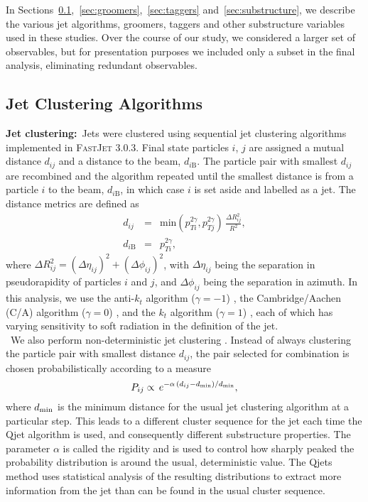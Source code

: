 In Sections~\ref{sec:jetalgs},~\ref{sec:groomers},~\ref{sec:taggers} and~\ref{sec:substructure}, we describe the various jet algorithms, groomers, taggers and other substructure variables used in these studies. Over the course of our study, we considered a larger set of observables, but for presentation purposes we included only a subset in the final analysis, eliminating redundant observables.

\subsection{Jet Clustering Algorithms}
\label{sec:jetalgs}

{\bf Jet clustering:}~Jets were clustered using sequential jet clustering algorithms \cite{Bethke:1988zc} implemented in \textsc{FastJet} 3.0.3. Final state particles $i$, $j$ are assigned a mutual distance $d_{ij}$ and a distance to the beam, $d_{i\mathrm{B}}$. The particle pair with smallest $d_{ij}$ are  recombined and the algorithm repeated until the smallest distance is from a particle $i$ to the beam, $d_{i\mathrm{B}}$, in which case $i$ is set aside and labelled as a jet. The distance metrics are defined as
%
\begin{eqnarray}
d_{ij} &=& \mathrm{min}(p_{Ti}^{2\gamma},p_{Tj}^{2\gamma})\,\frac{\Delta R_{ij}^2}{R^2},\\
d_{i\mathrm{B}} &=& p_{Ti}^{2\gamma},
\end{eqnarray}
%
where $\Delta R_{ij}^2=(\Delta \eta_{ij})^2+(\Delta\phi_{ij})^2$, with $\Delta \eta_{ij}$ being the separation in pseudorapidity of particles $i$ and $j$, and $\Delta \phi_{ij}$ being the separation in azimuth. In this analysis, we use the anti-$k_t$ algorithm ($\gamma=-1$) \cite{Cacciari:2008gp}, the Cambridge/Aachen (C/A) algorithm ($\gamma=0$) \cite{Dokshitzer:1997in,Wobisch:1998wt}, and the $k_t$ algorithm ($\gamma=1$) \cite{Catani:1993hr,Ellis:1993tq}, each of which has varying sensitivity to soft radiation in the definition of the jet.\\

~We also perform non-deterministic jet clustering \cite{Ellis:2012sn,Ellis:2014eya}. Instead of always clustering the particle pair with smallest distance $d_{ij}$, the pair selected for combination is chosen probabilistically according to a measure
%
\begin{equation}
P_{ij} \propto \,e^{-\alpha \,(d_{ij}-d_{\rm min})/d_{\rm min}},
\end{equation}
%
where $d_{\rm min}$ is the minimum distance for the usual jet clustering algorithm at a particular step. This leads to a different cluster sequence for the jet each time the Qjet algorithm is used, and consequently different substructure properties. The parameter $\alpha$ is called the rigidity and is used to control how sharply peaked the probability distribution is around the usual, deterministic value. The Qjets method uses statistical analysis of the resulting distributions to extract more information from the jet than can be found in the usual cluster sequence.

